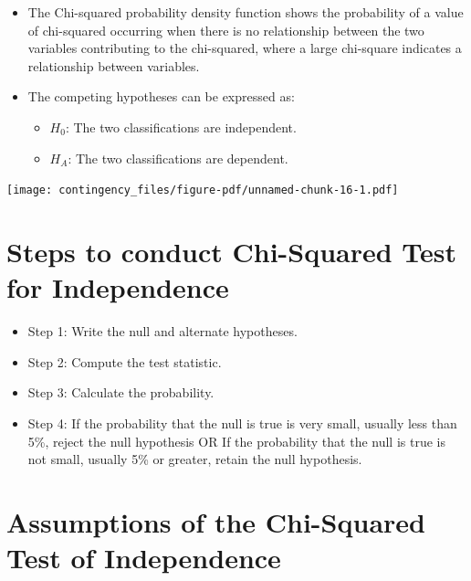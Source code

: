 \documentclass[
  letterpaper,
  DIV=11,
  numbers=noendperiod]{scrreprt}
\providecommand{\tightlist}{%
  \setlength{\itemsep}{0pt}\setlength{\parskip}{0pt}}\usepackage{longtable,booktabs,array}
\begin{document}
\begin{itemize}
\tightlist
\item
  The Chi-squared probability density function shows the probability of
  a value of chi-squared occurring when there is no relationship between
  the two variables contributing to the chi-squared, where a large
  chi-square indicates a relationship between variables.
\item
  The competing hypotheses can be expressed as:

  \begin{itemize}
  \tightlist
  \item
    \(H_0\): The two classifications are independent.
  \item
    \(H_A\): The two classifications are dependent.
  \end{itemize}
\end{itemize}

\texttt{[image: contingency\_files/figure-pdf/unnamed-chunk-16-1.pdf]}

\section{Steps to conduct Chi-Squared Test for
Independence}\label{steps-to-conduct-chi-squared-test-for-independence}

\begin{itemize}
\tightlist
\item
  Step 1: Write the null and alternate hypotheses.
\item
  Step 2: Compute the test statistic.
\item
  Step 3: Calculate the probability.
\item
  Step 4: If the probability that the null is true is very small,
  usually less than 5\%, reject the null hypothesis OR If the
  probability that the null is true is not small, usually 5\% or
  greater, retain the null hypothesis.
\end{itemize}

\section{Assumptions of the Chi-Squared Test of
Independence}\label{assumptions-of-the-chi-squared-test-of-independence}
\end{document}
